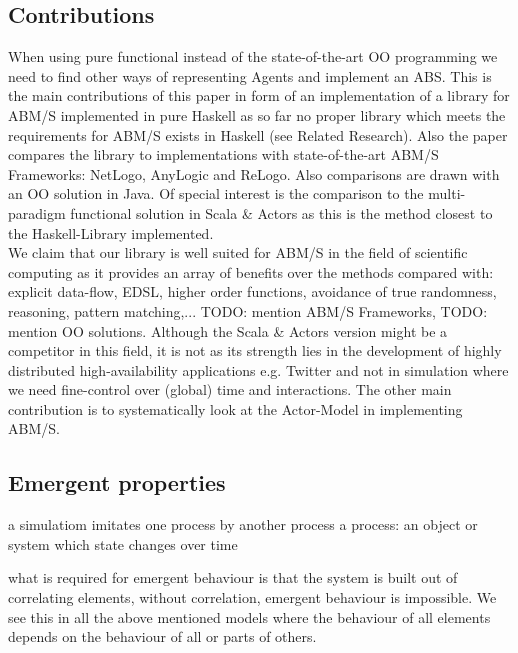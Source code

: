 \subsection{Contributions}
When using pure functional instead of the state-of-the-art OO programming we need to find other ways of representing Agents and implement an ABS. This is the main contributions of this paper in form of an implementation of a library for ABM/S implemented in pure Haskell as so far no proper library which meets the requirements for ABM/S exists in Haskell (see Related Research). Also the paper compares the library to implementations with state-of-the-art ABM/S Frameworks: NetLogo, AnyLogic and ReLogo. Also comparisons are drawn with an OO solution in Java. Of special interest is the comparison to the multi-paradigm functional solution in Scala \& Actors as this is the method closest to the Haskell-Library implemented. \\
We claim that our library is well suited for ABM/S in the field of scientific computing as it provides an array of benefits over the methods compared with: explicit data-flow, EDSL, higher order functions, avoidance of true randomness, reasoning, pattern matching,... TODO: mention ABM/S Frameworks, TODO: mention OO solutions. Although the Scala \& Actors version might be a competitor in this field, it is not as its strength lies in the development of highly distributed high-availability applications e.g. Twitter and not in simulation where we need fine-control over (global) time and interactions.
The other main contribution is to systematically look at the Actor-Model in implementing ABM/S.

\subsection{Emergent properties}
a simulatiom imitates one process by another process
a process: an object or system which state changes over time

what is required for emergent behaviour is that the system is built out of correlating elements, without correlation, emergent behaviour is impossible. We see this in all the above mentioned models where the behaviour of all elements depends on the behaviour of all or parts of others. 